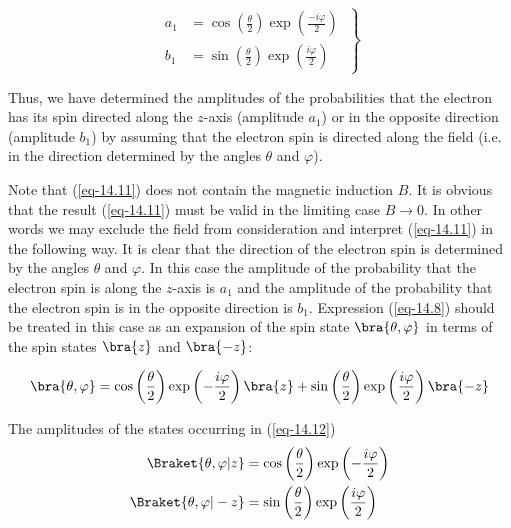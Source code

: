 \documentclass[a4paper,sfsidenotes,colorlinks=true]{tufte-book}
\numberwithin{equation}{section}
\numberwithin{figure}{section}
\begin{document}
\begin{equation}%
\left.
\begin{split}
a_{1} & = \cos \left( \frac{\theta}{2} \right)  \exp \left( \frac{-i
    \varphi}{2} \right) \\   
b_{1} & = \sin \left( \frac{\theta}{2} \right)  \exp \left( \frac{i
    \varphi}{2} \right) 
\end{split}
\; \right\}
\label{eq-14.11}
\end{equation}

Thus, we have determined the amplitudes of the probabilities that the electron has its spin directed along the $z$-axis (amplitude $a_{1}$) or in the opposite direction (amplitude $b_{1}$) by assuming that the electron spin is directed along the field (i.e. in the direction determined by the angles $\theta$ and $\varphi$).

Note that (\ref{eq-14.11}) does not contain the magnetic induction
$B$. It is obvious that the result (\ref{eq-14.11}) must be valid in
the limiting case $B \to 0$. In other words we may exclude the field
from consideration and interpret (\ref{eq-14.11}) in the following
way. It is clear that the direction of the electron spin is determined
by the angles $\theta$ and $\varphi$. In this case the amplitude of
the probability that the electron spin is along the $z$-axis is $a_{1}$ and
the amplitude of the probability that the electron spin is in the
opposite direction is $b_{1}$. Expression (\ref{eq-14.8}) should be treated in this
case as an expansion of the spin state $\bra{\theta, \varphi}$ in terms of the spin
states $\bra{z}$ and  $\bra{-z}$: 

\begin{equation}%
\bra{\theta, \varphi}  = \cos \left( \frac{\theta}{2} \right) \exp
\left( - \frac{ i \varphi}{2} \right) \bra{z} + \sin \left( \frac{\theta}{2} \right) \exp
\left( \frac{ i \varphi}{2} \right) \bra{- z}  
\label{eq-14.12}
\end{equation}

The amplitudes of the states occurring in (\ref{eq-14.12})
\begin{equation}%
\begin{split}
\Braket{\theta , \varphi | z} & = \cos \left( \frac{\theta}{2} \right) \exp
\left( - \frac{ i \varphi}{2} \right) \\
\Braket{\theta , \varphi | -z} & = \sin \left( \frac{\theta}{2} \right) \exp
\left( \frac{ i \varphi}{2}  \right)
\end{split}
\label{eq-14.13}
\end{equation}
\end{document}
